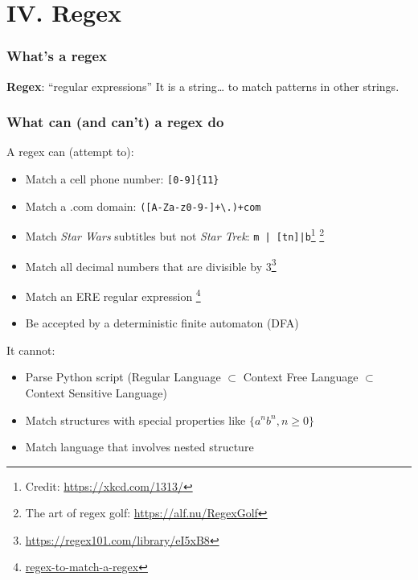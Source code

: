 
\section{IV. Regex}
\begin{frame}
    \frametitle{What's a regex}
    \textbf{Regex}: ``regular expressions''
    \newline \newline
    It is a string… to match patterns in other strings.
\end{frame}

\begin{frame}[fragile]
    \frametitle{What can (and can't) a regex do}
    A regex can (attempt to):
    \begin{itemize}
        \item Match a cell phone number: \verb|[0-9]{11}|
        \item Match a .com domain: \verb|([A-Za-z0-9-]+\.)+com|
        \item Match \textit{Star Wars} subtitles but not \textit{Star Trek}:
              \verb!m | [tn]|b!\footnote{Credit: \url{https://xkcd.com/1313/}}
              \footnote{The art of regex golf: \url{https://alf.nu/RegexGolf}}
        \item Match all decimal numbers that are divisible by 3\footnote{\url{https://regex101.com/library/eI5xB8}}
        \item Match an ERE regular expression \footnote{\href{https://stackoverflow.com/questions/17843691/javascript-regex-to-match-a-regex}{regex-to-match-a-regex}}
        \item Be accepted by a deterministic finite automaton (DFA)
    \end{itemize}
    It cannot:
    \begin{itemize}
        \item Parse Python script (Regular Language $\subset$ Context Free Language $\subset$ Context Sensitive Language)
        \item Match structures with special properties like $\{a^nb^n, n\geq 0\}$
        \item Match language that involves nested structure
    \end{itemize}
\end{frame}

